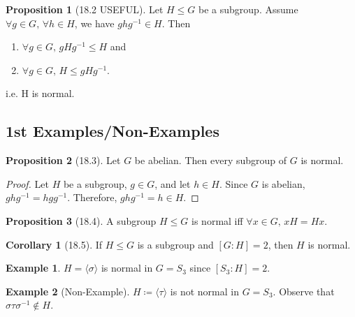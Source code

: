 \documentclass{article}
\newcommand{\coleq}{\coloneqq}
\newcommand{\inverse}[1]{#1^{-1}}
\theoremstyle{definition}
\newtheorem*{cor}{Corollary}
\newtheorem*{prop}{Proposition}
\newtheorem*{ex}{Example}
\theoremstyle{remark}
\newcommand{\gen}[1]{\langle#1\rangle}
\begin{document}
{        \begin{prop}[18.2 USEFUL]
            Let $H \leq G$ be a subgroup. Assume $\forall g \in G, \, \forall h \in H$, we have $gh\inverse{g}\in H$. Then
            \begin{enumerate}
                \item $\forall g \in G, \, gH\inverse{g}\leq H$ and
                \item $\forall g \in G, \, H \leq gH\inverse{g}$.
            \end{enumerate}
            i.e. H is normal.
        \end{prop}
        
        \subsection*{1st Examples/Non-Examples}{
            \begin{prop}[18.3]
                Let $G$ be abelian. Then every subgroup of $G$ is normal.
            \end{prop}
            
            \begin{proof}
                Let $H$ be a subgroup, $g \in G$, and let $h \in H$. Since $G$ is abelian, $gh\inverse{g}=hg\inverse{g}$. Therefore, $gh\inverse{g}=h \in H$.
            \end{proof}
            
            \begin{prop}[18.4]
                A subgroup $H\leq G$ is normal iff $\forall x \in G, \, xH=Hx$.
            \end{prop}
            
            \begin{cor}[18.5]
                If $H \leq G$ is a subgroup and $[G:H]=2$, then $H$ is normal.
            \end{cor}
            
            \begin{ex}
                $H=\gen{\sigma}$ is normal in $G=S_3$ since $[S_3:H]=2$.
            \end{ex}
            
            \begin{ex}[Non-Example]
                $H \coleq \gen{\tau}$ is not normal in $G=S_3$. Observe that $\sigma\tau\inverse{\sigma} \notin H$.
            \end{ex}
        }
    }
\end{document}
